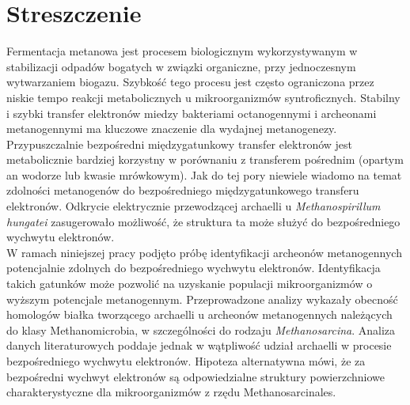 \documentclass[fontsize=12pt,headsepline=true, bibliography=totocnumbered, twoside]{scrbook} %
\begin{document}





\chapter*{Streszczenie} %

Fermentacja metanowa jest procesem biologicznym wykorzystywanym w stabilizacji odpadów bogatych w związki organiczne, przy  jednoczesnym wytwarzaniem biogazu. Szybkość tego procesu jest często ograniczona przez niskie tempo reakcji metabolicznych u mikroorganizmów syntroficznych. Stabilny i szybki transfer elektronów miedzy bakteriami octanogennymi i archeonami metanogennymi ma kluczowe znaczenie dla wydajnej metanogenezy. Przypuszczalnie  bezpośredni międzygatunkowy transfer elektronów jest metabolicznie bardziej korzystny w porównaniu z transferem pośrednim (opartym an wodorze lub kwasie mrówkowym). Jak do tej pory niewiele wiadomo na temat zdolności metanogenów do bezpośredniego międzygatunkowego transferu elektronów. Odkrycie elektrycznie przewodzącej archaelli u \textit{Methanospirillum hungatei} zasugerowało możliwość, że struktura ta może służyć do bezpośredniego wychwytu elektronów.\\ 
W ramach niniejszej pracy podjęto próbę identyfikacji archeonów metanogennych potencjalnie zdolnych do bezpośredniego wychwytu elektronów. Identyfikacja takich gatunków może pozwolić na uzyskanie populacji mikroorganizmów o wyższym potencjale metanogennym.
Przeprowadzone analizy wykazały obecność homologów białka tworzącego archaelli u archeonów metanogennych należących do klasy Methanomicrobia, w szczególności do rodzaju \textit{Methanosarcina}. Analiza danych literaturowych poddaje jednak w wątpliwość udział archaelli w procesie bezpośredniego wychwytu elektronów. Hipoteza alternatywna mówi, że za bezpośredni wychwyt elektronów są odpowiedzialne struktury powierzchniowe charakterystyczne dla mikroorganizmów z rzędu Methanosarcinales.






\end{document}
